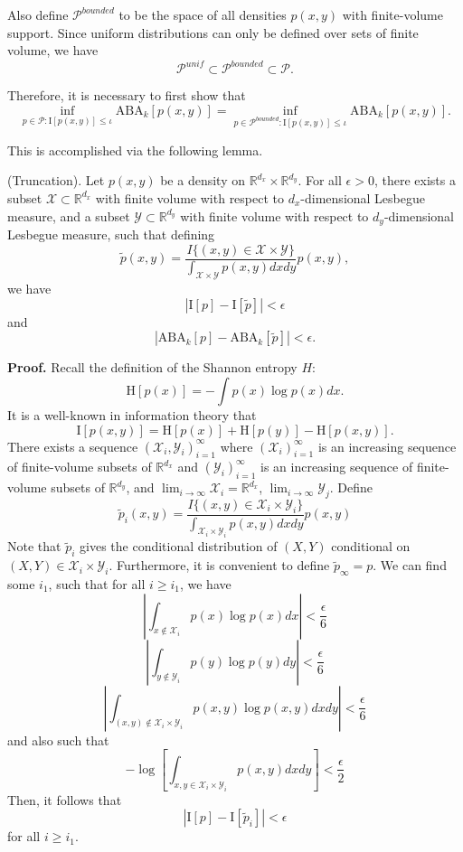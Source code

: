 \documentclass[12pt]{article}
\begin{document}
Also define $\mathcal{P}^{bounded}$ to be the space of all densities $p(x, y)$ with finite-volume support.
Since uniform distributions can only be defined over sets of finite volume, we have
\[
\mathcal{P}^{unif} \subset \mathcal{P}^{bounded} \subset \mathcal{P}.
\]

Therefore, it is necessary to first show that
\[
\inf_{p \in \mathcal{P}: \text{I}[p(x,y)] \leq \iota} \text{ABA}_k[p(x,y)] = 
\inf_{p \in \mathcal{P}^{bounded}: \text{I}[p(x,y)] \leq \iota} \text{ABA}_k[p(x,y)].
\]

This is accomplished via the following lemma.

\begin{lemma}\label{lemma:truncation} (Truncation).
Let $p(x, y)$ be a density on
$\mathbb{R}^{d_x} \times \mathbb{R}^{d_y}$.  For all $\epsilon > 0$,
there exists a subset $\mathcal{X} \subset \mathbb{R}^{d_x}$ with
finite volume with respect to $d_x$-dimensional Lesbegue measure, and
a subset $\mathcal{Y} \subset \mathbb{R}^{d_y}$ with finite volume
with respect to $d_y$-dimensional Lesbegue measure, such that defining
\[
\tilde{p}(x, y) = \frac{I\{(x,y) \in \mathcal{X}\times \mathcal{Y}\} }{\int_{\mathcal{X} \times \mathcal{Y}} p(x,y) dx dy} p(x,y),
\]
we have
\[
|\text{I}[p] - \text{I}[\tilde{p}]| < \epsilon
\]
and
\[
|\text{ABA}_k[p] - \text{ABA}_k[\tilde{p}]| < \epsilon.
\]
\end{lemma}

\textbf{Proof.}
Recall the definition of the Shannon entropy $H$:
\[
\text{H}[p(x)] = - \int p(x) \log p(x) dx.
\]
It is a well-known in information theory that
\[
\text{I}[p(x, y)] = \text{H}[p(x)] + \text{H}[p(y)] - \text{H}[p(x, y)].
\]
There exists a sequence $(\mathcal{X}_i, \mathcal{Y}_i)_{i=1}^\infty$
where $(\mathcal{X}_i)_{i=1}^\infty$ is an increasing sequence of finite-volume subsets of $\mathbb{R}^{d_x}$
and $(\mathcal{Y}_i)_{i=1}^\infty$ is an increasing sequence of finite-volume subsets of $\mathbb{R}^{d_y}$,
and $\lim_{i \to \infty} \mathcal{X}_i = \mathbb{R}^{d_x}$, $\lim_{i \to \infty} \mathcal{Y}_j$.
Define
\[
\tilde{p}_i(x, y) = \frac{I\{(x,y) \in \mathcal{X}_i\times \mathcal{Y}_i\} }{\int_{\mathcal{X}_i \times \mathcal{Y}_i} p(x,y) dx dy} p(x,y)
\]
Note that $\tilde{p}_i$ gives the conditional distribution of $(X, Y)$
conditional on $(X, Y) \in \mathcal{X}_i \times \mathcal{Y}_i$. 
Furthermore, it is convenient to define $\tilde{p}_\infty = p$.
We can find some $i_1$, such that for all $i \geq i_1$, we have
\[
\left|\int_{x \notin \mathcal{X}_i} p(x) \log p(x) dx\right| < \frac{\epsilon}{6}
\]
\[
\left|\int_{y \notin \mathcal{Y}_i} p(y) \log p(y) dy\right| < \frac{\epsilon}{6}
\]
\[
\left|\int_{(x,y) \notin \mathcal{X}_i \times \mathcal{Y}_i} p(x, y) \log p(x, y) dx dy\right| < \frac{\epsilon}{6}
\]
and also such that
\[
-\log \left[\int_{x, y \in \mathcal{X}_i \times \mathcal{Y}_i} p(x, y) dx dy\right] < \frac{\epsilon}{2}
\]
Then, it follows that
\[
|\text{I}[p] - \text{I}[\tilde{p}_i]| < \epsilon
\]
for all $i \geq i_1$.
\end{document}

